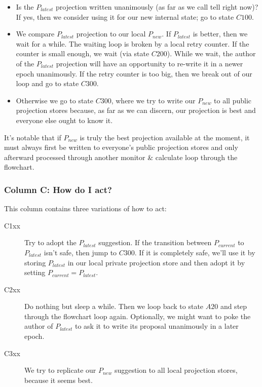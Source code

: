 \documentclass[preprint,10pt]{sigplanconf}
\begin{document}
\begin{itemize}

\item Is the $P_{latest}$ projection written unanimously (as far as we
  call tell right now)?  If yes, then we consider
  using it for our new internal state; go to state $C100$.

\item We compare $P_{latest}$ projection to our local $P_{new}$.
  If $P_{latest}$ is better,
  then we wait for a while.  The waiting loop is broken by a local
  retry counter.  If the counter is small enough, we wait (via state
  $C200$).  While we wait, the author of the $P_{latest}$ projection will
  have an opportunity to re-write it in a newer epoch
  unanimously.  If the retry counter is too big, then we break out of
  our loop and go to state $C300$.

\item Otherwise we go to state $C300$, where we try to write our
  $P_{new}$ to all public projection stores because, as far as we can
  discern, our projection is best and everyone else ought to know it.

\end{itemize}

It's notable that if $P_{new}$ is truly the best projection available
at the moment, it must always first be written to everyone's
public projection stores and only afterward processed through another
monitor \& calculate loop through the flowchart.

\subsubsection{Column C: How do I act?}

This column contains three variations of how to act:

\begin{description}

\item[C1xx] Try to adopt the $P_{latest}$ suggestion.  If the
  transition between $P_{current}$ to $P_{latest}$ isn't safe, then
  jump to $C300$.  If it is completely safe, we'll use it by storing
  $P_{latest}$ in our local private projection store and then adopt it
  by setting $P_{current} = P_{latest}$.

\item[C2xx] Do nothing but sleep a while.  Then we loop back to state
  $A20$ and step through the flowchart loop again.  Optionally, we
  might want to poke the author of $P_{latest}$ to ask it to write
  its proposal unanimously in a later epoch.

\item[C3xx] We try to replicate our $P_{new}$ suggestion to all local
  projection stores, because it seems best.

\end{description}
\end{document}
